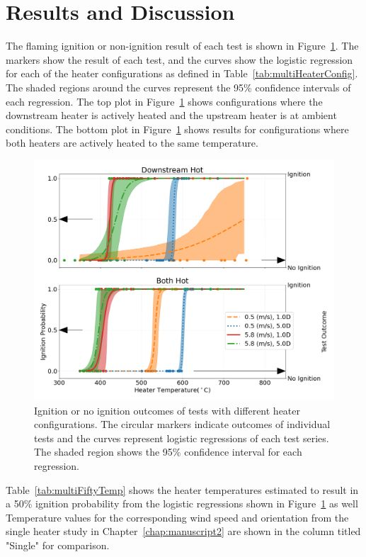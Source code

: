 \section{Results and Discussion}
    The flaming ignition or non-ignition result of each test is shown in Figure~\ref{fig:multi_heater_hot_vs_ambient}. The markers show the result of each test, and the curves show the logistic regression for each of the heater configurations as defined in Table~\ref{tab:multiHeaterConfig}. The shaded regions around the curves represent the 95\% confidence intervals of each regression. The top plot in Figure~\ref{fig:multi_heater_hot_vs_ambient} shows configurations where the downstream heater is actively heated and the upstream heater is at ambient conditions. The bottom plot in Figure~\ref{fig:multi_heater_hot_vs_ambient} shows results for configurations where both heaters are actively heated to the same temperature.
        \begin{figure}[hpbt]
            \centering
            \includegraphics[width=0.75\columnwidth]{Figures/multi_heater_plot.png}
            \caption{Ignition or no ignition outcomes of tests with different heater configurations. The circular markers indicate outcomes of individual tests and the curves represent logistic regressions of each test series. The shaded region shows the 95\% confidence interval for each regression.}
            \label{fig:multi_heater_hot_vs_ambient}
        \end{figure}
    Table~\ref{tab:multiFiftyTemp} shows the heater temperatures estimated to result in a 50\% ignition probability from the logistic regressions shown in Figure~\ref{fig:multi_heater_hot_vs_ambient} as well  Temperature values for the corresponding wind speed and orientation from the single heater study in Chapter~\ref{chap:manuscript2} are shown in the column titled "Single" for comparison. 
